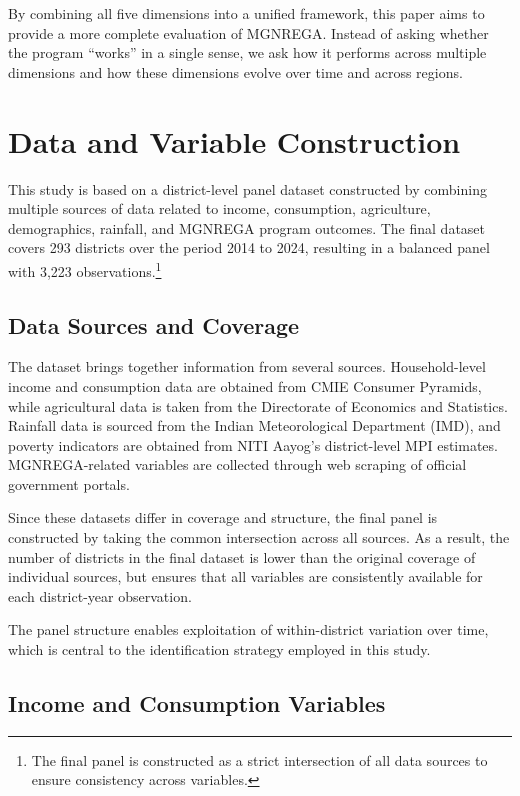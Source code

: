\documentclass[12pt]{article}
\begin{document}
By combining all five dimensions into a unified framework, this paper aims to provide a more complete evaluation of MGNREGA. Instead of asking whether the program “works” in a single sense, we ask how it performs across multiple dimensions and how these dimensions evolve over time and across regions.


\section{Data and Variable Construction}

This study is based on a district-level panel dataset constructed by combining multiple sources of data related to income, consumption, agriculture, demographics, rainfall, and MGNREGA program outcomes. The final dataset covers 293 districts over the period 2014 to 2024, resulting in a balanced panel with 3,223 observations.\footnote{The final panel is constructed as a strict intersection of all data sources to ensure consistency across variables.}

\subsection{Data Sources and Coverage}

The dataset brings together information from several sources. Household-level income and consumption data are obtained from CMIE Consumer Pyramids, while agricultural data is taken from the Directorate of Economics and Statistics. Rainfall data is sourced from the Indian Meteorological Department (IMD), and poverty indicators are obtained from NITI Aayog’s district-level MPI estimates. MGNREGA-related variables are collected through web scraping of official government portals.

Since these datasets differ in coverage and structure, the final panel is constructed by taking the common intersection across all sources. As a result, the number of districts in the final dataset is lower than the original coverage of individual sources, but ensures that all variables are consistently available for each district-year observation.

The panel structure enables exploitation of within-district variation over time, which is central to the identification strategy employed in this study.

\subsection{Income and Consumption Variables}
\end{document}
